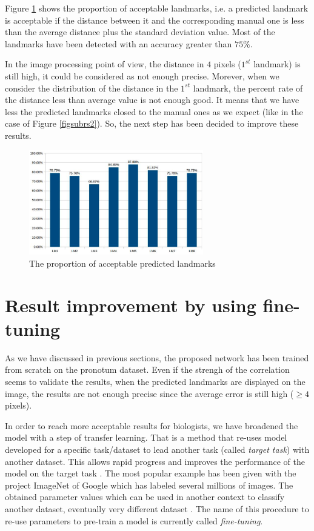 \documentclass{article} %
\begin{document}
\begin{multicols}{2}
Figure \ref{figchart} shows the proportion of acceptable landmarks, i.e. a predicted landmark is acceptable if the distance between it and the corresponding manual one is less than the average distance plus the standard deviation  value. Most of the landmarks have been detected with an accuracy greater than $75\%$. 

In the image processing point of view, the distance in $4$ pixels ($1^{st}$ landmark) is still high, it could be considered as not enough precise. Morever, when we consider the distribution of the distance in the $1^{st}$ landmark, the percent rate of the distance less than average value is not enough good. It means that we have less the predicted landmarks closed to the manual ones as we expect (like in the case of Figure \ref{figsubrs2}). So, the next step has been decided to improve these results. 

\begin{figure}[H]
	\centerline{\includegraphics[height=1.8in]{images/chart.eps}}
	\caption{\footnotesize{The proportion of acceptable predicted landmarks}}
	\label{figchart}
\end{figure}

\section{Result improvement by using fine-tuning}
\label{secimproving}
As we have discussed in previous sections, the proposed network has been trained from scratch on the pronotum dataset. Even if the strengh of the correlation seems to validate the results, when the predicted landmarks are displayed on the image, the results are not enough precise since the average error is still high ($\geq 4$ pixels).

In order to reach more acceptable results for biologists, we have
broadened the model with a step of transfer learning. That is a
method that re-uses model developed for a specific task/dataset
to lead another task (called \textit{target task}) with another dataset. This allows rapid progress and improves the performance of the model on the target task \cite{torrey2009transfer}. The most popular
example has been given with the project ImageNet of Google \cite{imagenet_cvpr09} which has labeled several millions of images. The obtained parameter values which can
be used in another context to classify another dataset, eventually
very different dataset \cite{margeta2017fine}. The name of this procedure to re-use parameters
to pre-train a model is currently called \textit{fine-tuning}.


\end{multicols}
\end{document}

